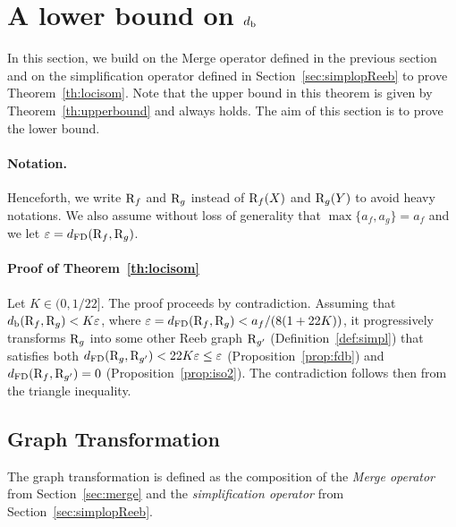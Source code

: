 \section{A lower bound on $d_{\rm b}$}
\label{sec:lowerbound}


In this section, we build on the Merge operator defined in the previous section and on the 
simplification operator defined in Section~\ref{sec:simplopReeb} to prove Theorem~\ref{th:locisom}.
Note that the upper bound in this theorem is given by Theorem~\ref{th:upperbound}
and always holds. The aim of this section is to prove the lower bound.

\paragraph*{Notation.} Henceforth, we write $\mathrm{R}_f$ and $\mathrm{R}_g$ instead of $\mathrm{R}_f(X)$ and $\mathrm{R}_g(Y)$ 
to avoid heavy notations. We also assume without loss of generality that $\max\{a_f,a_g\}=a_f$
and we let $\varepsilon=d_{\rm FD}(\mathrm{R}_f,\mathrm{R}_g)$.

\paragraph*{Proof of Theorem~\ref{th:locisom}}
Let $K\in(0,1/22]$.
The proof proceeds by contradiction. Assuming that $d_{\rm b}(\mathrm{R}_f, \mathrm{R}_g) < K\varepsilon$, 
where $\varepsilon=d_{\rm FD}(\mathrm{R}_f, \mathrm{R}_g)< a_f/(8(1+22K))$, 
it  progressively transforms $\mathrm{R}_g$ into some other Reeb graph $\mathrm{R}_{g'}$ 
(Definition~\ref{def:simpl}) %
that satisfies both $d_{\rm FD}(\mathrm{R}_g, \mathrm{R}_{g'})< 22K\varepsilon \leq \varepsilon$ (Proposition~\ref{prop:fdb}) %
and $d_{\rm FD}(\mathrm{R}_f, \mathrm{R}_{g'})=0$ (Proposition~\ref{prop:iso2}). %
The contradiction follows then from the triangle inequality. 

\subsection*{Graph Transformation}
\label{sec:smoothope}

The graph transformation is defined as the composition of the {\em Merge operator} from Section~\ref{sec:merge}
and the {\em simplification operator} from Section~\ref{sec:simplopReeb}. %


